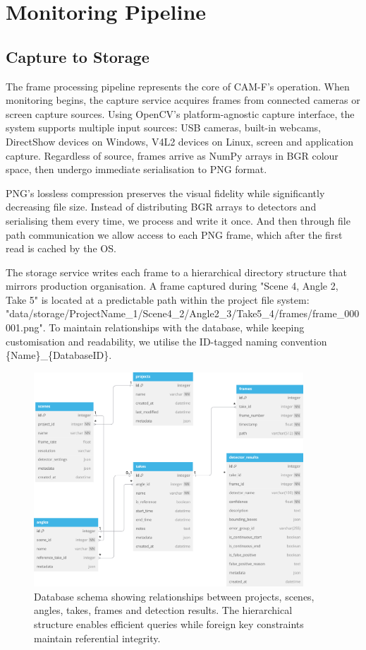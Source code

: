\section{Monitoring Pipeline}

\subsection{Capture to Storage}
The frame processing pipeline represents the core of CAM-F's operation. When monitoring begins, the capture service acquires frames from connected cameras or screen capture sources. Using OpenCV's platform-agnostic capture interface, the system supports multiple input sources: USB cameras, built-in webcams, DirectShow devices on Windows, V4L2 devices on Linux, screen and application capture. Regardless of source, frames arrive as NumPy arrays in BGR colour space, then undergo immediate serialisation to PNG format.

PNG's lossless compression preserves the visual fidelity while significantly decreasing file size. Instead of distributing BGR arrays to detectors and serialising them every time, we process and write it once. And then through file path communication we allow access to each PNG frame, which after the first read is cached by the OS. 

The storage service writes each frame to a hierarchical directory structure that mirrors production organisation. A frame captured during "Scene 4, Angle 2, Take 5" is located at a predictable path within the project file system: "data/storage/ProjectName\_1/Scene4\_2/Angle2\_3/Take5\_4/frames/frame\_000001.png". To maintain relationships with the database, while keeping customisation and readability, we utilise the ID-tagged naming convention \{Name\}\_\{DatabaseID\}.

\begin{figure}[h]
\centering
\includegraphics[width=0.9\textwidth]{figures/database.png}
\caption{Database schema showing relationships between projects, scenes, angles, takes, frames and detection results. The hierarchical structure enables efficient queries while foreign key constraints maintain referential integrity.}
\label{fig:database-relationships}
\end{figure}

